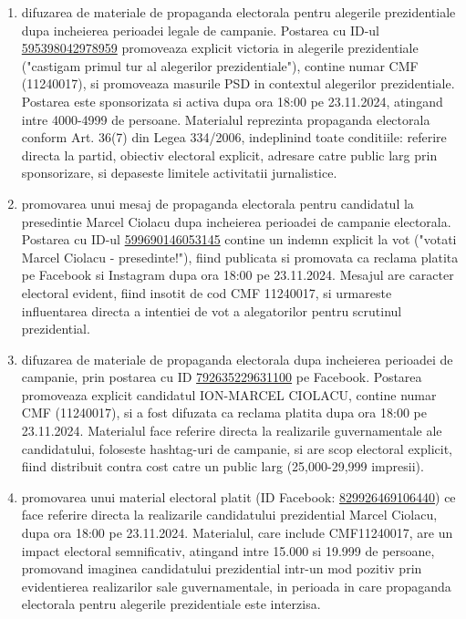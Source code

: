 \documentclass[a4paper,12pt]{article}
\begin{document}
\begin{enumerate}[leftmargin=*, label=\arabic*.)]
    \item difuzarea de materiale de propaganda electorala pentru alegerile prezidentiale dupa incheierea perioadei legale de campanie. Postarea cu ID-ul \href{https://www.facebook.com/ads/library/?id=595398042978959}{595398042978959} promoveaza explicit victoria in alegerile prezidentiale ("castigam primul tur al alegerilor prezidentiale"), contine numar CMF (11240017), si promoveaza masurile PSD in contextul alegerilor prezidentiale. Postarea este sponsorizata si activa dupa ora 18:00 pe 23.11.2024, atingand intre 4000-4999 de persoane. Materialul reprezinta propaganda electorala conform Art. 36(7) din Legea 334/2006, indeplinind toate conditiile: referire directa la partid, obiectiv electoral explicit, adresare catre public larg prin sponsorizare, si depaseste limitele activitatii jurnalistice.
    \item promovarea unui mesaj de propaganda electorala pentru candidatul la presedintie Marcel Ciolacu dupa incheierea perioadei de campanie electorala. Postarea cu ID-ul \href{https://www.facebook.com/ads/library/?id=599690146053145}{599690146053145} contine un indemn explicit la vot ("votati Marcel Ciolacu - presedinte!"), fiind publicata si promovata ca reclama platita pe Facebook si Instagram dupa ora 18:00 pe 23.11.2024. Mesajul are caracter electoral evident, fiind insotit de cod CMF 11240017, si urmareste influentarea directa a intentiei de vot a alegatorilor pentru scrutinul prezidential.
    \item difuzarea de materiale de propaganda electorala dupa incheierea perioadei de campanie, prin postarea cu ID \href{https://www.facebook.com/ads/library/?id=792635229631100}{792635229631100} pe Facebook. Postarea promoveaza explicit candidatul ION-MARCEL CIOLACU, contine numar CMF (11240017), si a fost difuzata ca reclama platita dupa ora 18:00 pe 23.11.2024. Materialul face referire directa la realizarile guvernamentale ale candidatului, foloseste hashtag-uri de campanie, si are scop electoral explicit, fiind distribuit contra cost catre un public larg (25,000-29,999 impresii).
    \item promovarea unui material electoral platit (ID Facebook: \href{https://www.facebook.com/ads/library/?id=829926469106440}{829926469106440}) ce face referire directa la realizarile candidatului prezidential Marcel Ciolacu, dupa ora 18:00 pe 23.11.2024. Materialul, care include CMF11240017, are un impact electoral semnificativ, atingand intre 15.000 si 19.999 de persoane, promovand imaginea candidatului prezidential intr-un mod pozitiv prin evidentierea realizarilor sale guvernamentale, in perioada in care propaganda electorala pentru alegerile prezidentiale este interzisa.

\end{enumerate}
\end{document}
